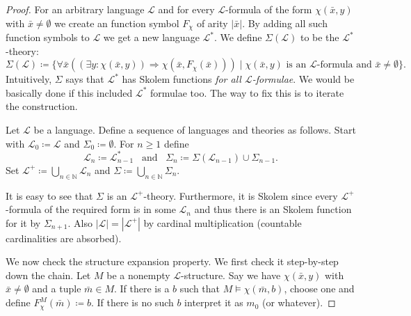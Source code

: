 \documentclass{report}
\theoremstyle{definition}
\theoremstyle{plain}
\theoremstyle{definition}
\begin{document}
 		\begin{proof}
 			For an arbitrary language $\mathcal{L}$ and for every $\mathcal{L}$-formula of the form $\chi(\bar{x},y)$ with $\bar{x}\neq \emptyset$ we create an function symbol $F_{\chi}$ of arity $|\bar{x}|$. By adding all such function symbols to $\mathcal{L}$ we get a new language $\mathcal{L}^*$. We define $\Sigma(\mathcal{L})$ to be the $\mathcal{L}^*$-theory:
 			\[
 				\Sigma(\mathcal{L}) \coloneqq \{\forall \bar{x} ((\exists y: \chi(\bar{x}, y))\Rightarrow \chi(\bar{x}, F_{\chi}(\bar{x}))) \mid \chi(\bar{x},y) \text{ is an $\mathcal{L}$-formula and $\bar{x}\neq\emptyset$}\}.
 			\]
 			Intuitively, $\Sigma$ says that $\mathcal{L}^*$ has Skolem functions \emph{for all $\mathcal{L}$-formulae}. We would be basically done if this included $\mathcal{L}^*$ formulae too. The way to fix this is to iterate the construction.
 			
 			Let $\mathcal{L}$ be a language. Define a sequence of languages and theories as follows. Start with $\mathcal{L}_0 \coloneqq \mathcal{L}$ and $\Sigma_0 \coloneqq \emptyset$. For $n\geq 1$ define
 			\[
 				\mathcal{L}_{n} \coloneqq \mathcal{L}_{n-1}^* \,\,\,\text{ and }\,\,\,\Sigma_n \coloneqq \Sigma(\mathcal{L}_{n-1}) \cup \Sigma_{n-1}.
 			\]
 			Set $\mathcal{L}^+ \coloneqq \bigcup_{n \in \mathbb{N}} \mathcal{L}_n$ and $\Sigma \coloneqq \bigcup_{n\in \mathbb{N}} \Sigma_n$.
 			
 			It is easy to see that $\Sigma$ is an $\mathcal{L}^+$-theory. Furthermore, it is Skolem since every $\mathcal{L}^+$-formula of the required form is in some $\mathcal{L}_n$ and thus there is an Skolem function for it by $\Sigma_{n+1}$. Also $|\mathcal{L}| = |\mathcal{L}^+|$ by cardinal multiplication (countable cardinalities are absorbed).
 					
 			We now check the structure expansion property. We first check it step-by-step down the chain. Let $M$ be a nonempty $\mathcal{L}$-structure. Say we have $\chi(\bar{x},y)$ with $\bar{x}\neq\emptyset$ and a tuple $\bar{m}\in M$. If there is a $b$ such that $M \models \chi(\bar{m}, b)$, choose one and define $F_{\chi}^M(\bar{m}) \coloneqq b$. If there is no such $b$ interpret it as $m_0$ (or whatever).
 		\end{proof}
\end{document}
